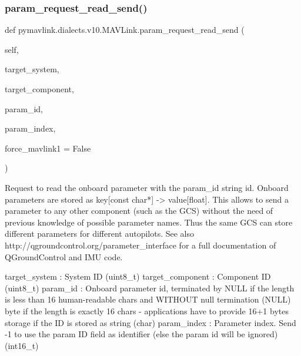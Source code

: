 \begin{DoxyVerb}
\begin{DoxyVerb}
\begin{DoxyVerb}
\begin{DoxyVerb}
\subsubsection{\texorpdfstring{param\+\_\+request\+\_\+read\+\_\+send()}{param\_request\_read\_send()}}
{\footnotesize\ttfamily def pymavlink.\+dialects.\+v10.\+M\+A\+V\+Link.\+param\+\_\+request\+\_\+read\+\_\+send (\begin{DoxyParamCaption}\item[{}]{self,  }\item[{}]{target\+\_\+system,  }\item[{}]{target\+\_\+component,  }\item[{}]{param\+\_\+id,  }\item[{}]{param\+\_\+index,  }\item[{}]{force\+\_\+mavlink1 = {\ttfamily False} }\end{DoxyParamCaption})}

\begin{DoxyVerb}Request to read the onboard parameter with the param_id string id.
Onboard parameters are stored as key[const char*] ->
value[float]. This allows to send a parameter to any
other component (such as the GCS) without the need of
previous knowledge of possible parameter names. Thus
the same GCS can store different parameters for
different autopilots. See also
http://qgroundcontrol.org/parameter_interface for a
full documentation of QGroundControl and IMU code.

target_system             : System ID (uint8_t)
target_component          : Component ID (uint8_t)
param_id                  : Onboard parameter id, terminated by NULL if the length is less than 16 human-readable chars and WITHOUT null termination (NULL) byte if the length is exactly 16 chars - applications have to provide 16+1 bytes storage if the ID is stored as string (char)
param_index               : Parameter index. Send -1 to use the param ID field as identifier (else the param id will be ignored) (int16_t)\end{DoxyVerb}
 \mbox{\label{classpymavlink_1_1dialects_1_1v10_1_1MAVLink_a935cd20d3f8459fb4405ca08f89e3ed0}} 

\end{DoxyVerb}
\end{DoxyVerb}
\end{DoxyVerb}
\end{DoxyVerb}
